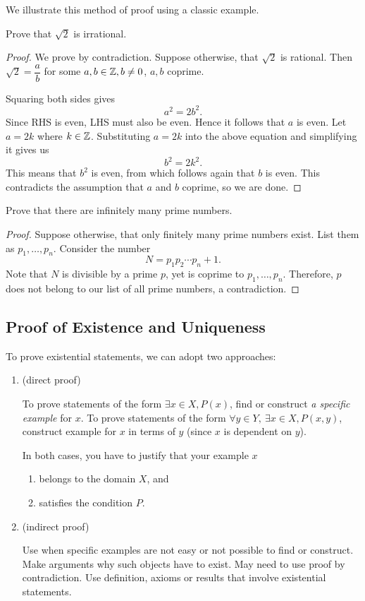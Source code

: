 We illustrate this method of proof using a classic example.

\begin{example}
Prove that $\sqrt{2}$ is irrational.
\begin{proof}
We prove by contradiction. Suppose otherwise, that $\sqrt{2}$ is rational. Then $\sqrt{2}=\dfrac{a}{b}$ for some $a,b\in\mathbb Z,b\neq 0$, $a,b$ coprime.

Squaring both sides gives
\[a^2=2b^2.\]
Since RHS is even, LHS must also be even. Hence it follows that $a$ is even. Let $a=2k$ where $k\in\mathbb Z$. Substituting $a = 2k$ into the above equation and simplifying it gives us
\[b^2=2k^2.\]
This means that $b^2$ is even, from which follows again that $b$ is even. This contradicts the assumption that $a$ and $b$ coprime, so we are done.
\end{proof}
\end{example}

\begin{example}[Euclid]
Prove that there are infinitely many prime numbers.

\begin{proof}
Suppose otherwise, that only finitely many prime numbers exist. List them as $p_1,\dots,p_n$. Consider the number
\[N=p_1p_2\cdots p_n+1.\]
Note that $N$ is divisible by a prime $p$, yet is coprime to $p_1,\dots,p_n$. Therefore, $p$ does not belong to our list of all prime numbers, a contradiction.
\end{proof}
\end{example}
\pagebreak

\subsection{Proof of Existence and Uniqueness}
To prove existential statements, we can adopt two approaches:
\begin{enumerate}
\item {} (direct proof)

To prove statements of the form $\exists x\in X, P(x)$, find or construct \emph{a specific example} for $x$. To prove statements of the form $\forall y\in Y,\:\exists x\in X, P(x,y)$, construct example for $x$ in terms of $y$ (since $x$ is dependent on $y$).

In both cases, you have to justify that your example $x$
\begin{enumerate}
\item belongs to the domain $X$, and
\item satisfies the condition $P$.
\end{enumerate}

\item {} (indirect proof)

Use when specific examples are not easy or not possible to find or construct.
Make arguments why such objects have to exist.
May need to use proof by contradiction.
Use definition, axioms or results that involve existential statements.
\end{enumerate}

